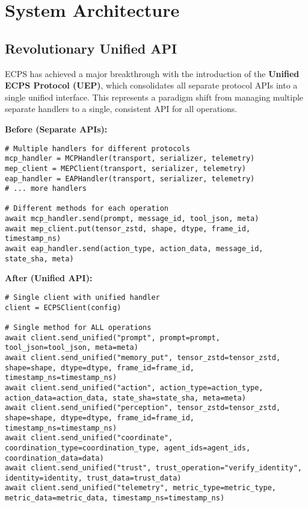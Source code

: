 \documentclass[12pt]{article}
\begin{document}
\section{System Architecture}

\subsection{Revolutionary Unified API}
ECPS has achieved a major breakthrough with the introduction of the \textbf{Unified ECPS Protocol (UEP)}, which consolidates all separate protocol APIs into a single unified interface. This represents a paradigm shift from managing multiple separate handlers to a single, consistent API for all operations.

\textbf{Before (Separate APIs):}
\begin{verbatim}
# Multiple handlers for different protocols
mcp_handler = MCPHandler(transport, serializer, telemetry)
mep_client = MEPClient(transport, serializer, telemetry)
eap_handler = EAPHandler(transport, serializer, telemetry)
# ... more handlers

# Different methods for each operation
await mcp_handler.send(prompt, message_id, tool_json, meta)
await mep_client.put(tensor_zstd, shape, dtype, frame_id, timestamp_ns)
await eap_handler.send(action_type, action_data, message_id, state_sha, meta)
\end{verbatim}

\textbf{After (Unified API):}
\begin{verbatim}
# Single client with unified handler
client = ECPSClient(config)

# Single method for ALL operations
await client.send_unified("prompt", prompt=prompt, tool_json=tool_json, meta=meta)
await client.send_unified("memory_put", tensor_zstd=tensor_zstd, shape=shape, dtype=dtype, frame_id=frame_id, timestamp_ns=timestamp_ns)
await client.send_unified("action", action_type=action_type, action_data=action_data, state_sha=state_sha, meta=meta)
await client.send_unified("perception", tensor_zstd=tensor_zstd, shape=shape, dtype=dtype, frame_id=frame_id, timestamp_ns=timestamp_ns)
await client.send_unified("coordinate", coordination_type=coordination_type, agent_ids=agent_ids, coordination_data=data)
await client.send_unified("trust", trust_operation="verify_identity", identity=identity, trust_data=trust_data)
await client.send_unified("telemetry", metric_type=metric_type, metric_data=metric_data, timestamp_ns=timestamp_ns)
\end{verbatim}
\end{document}
